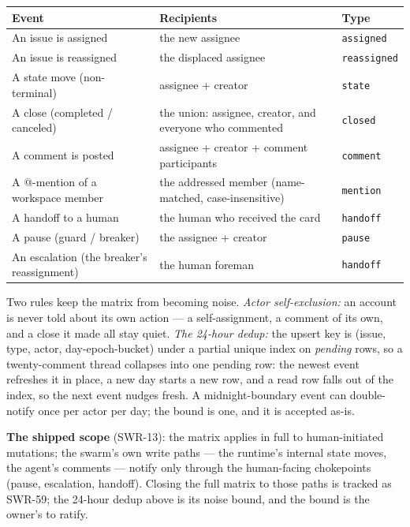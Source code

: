 \documentclass[11pt,a4paper]{report}
\begin{document}
\begin{center}
\begin{tabular}{@{}p{}p{}p{}@{}}
\toprule
\textbf{Event} & \textbf{Recipients} & \textbf{Type}\\
\midrule
An issue is assigned & the new assignee & \texttt{assigned}\\
An issue is reassigned & the displaced assignee & \texttt{reassigned}\\
A state move (non-terminal) & assignee + creator & \texttt{state}\\
A close (completed / canceled) & the union: assignee, creator,
  and everyone who commented & \texttt{closed}\\
A comment is posted & assignee + creator + comment
  participants & \texttt{comment}\\
A @-mention of a workspace member & the addressed member
  (name-matched, case-insensitive) & \texttt{mention}\\
A handoff to a human & the human who received the card &
  \texttt{handoff}\\
A pause (guard / breaker) & the assignee + creator & \texttt{pause}\\
An escalation (the breaker's reassignment) & the human foreman &
  \texttt{handoff}\\
\bottomrule
\end{tabular}
\end{center}

Two rules keep the matrix from becoming noise. \emph{Actor
self-exclusion:} an account is never told about its own action --- a
self-assignment, a comment of its own, and a close it made all stay
quiet. \emph{The 24-hour dedup:} the upsert key is
(issue, type, actor, day-epoch-bucket) under a partial unique index on
\emph{pending} rows, so a twenty-comment thread collapses into one
pending row: the newest event refreshes it in place, a new day starts a
new row, and a read row falls out of the index, so the next event
nudges fresh. A midnight-boundary event can double-notify once per actor
per day; the bound is one, and it is accepted as-is.

\textbf{The shipped scope} (SWR-13): the matrix applies in full to
human-initiated mutations; the swarm's own write paths --- the
runtime's internal state moves, the agent's comments --- notify only
through the human-facing chokepoints (pause, escalation, handoff).
Closing the full matrix to those paths is tracked as SWR-59; the
24-hour dedup above is its noise bound, and the bound is the owner's
to ratify.
\end{document}
